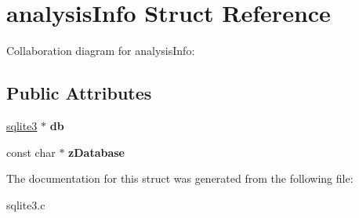 \hypertarget{structanalysisInfo}{}\section{analysis\+Info Struct Reference}
\label{structanalysisInfo}


Collaboration diagram for analysis\+Info\+:
\subsection*{Public Attributes}
\begin{DoxyCompactItemize}
\item 
\hyperlink{structsqlite3}{sqlite3} $\ast$ {\bfseries db}\hypertarget{structanalysisInfo_a13108eadc55ffe73a8825fb91cc0f9b5}{}\label{structanalysisInfo_a13108eadc55ffe73a8825fb91cc0f9b5}

\item 
const char $\ast$ {\bfseries z\+Database}\hypertarget{structanalysisInfo_accbe3c1f5613ffa13b9578e58a5d850a}{}\label{structanalysisInfo_accbe3c1f5613ffa13b9578e58a5d850a}

\end{DoxyCompactItemize}


The documentation for this struct was generated from the following file\+:\begin{DoxyCompactItemize}
\item 
sqlite3.\+c\end{DoxyCompactItemize}
